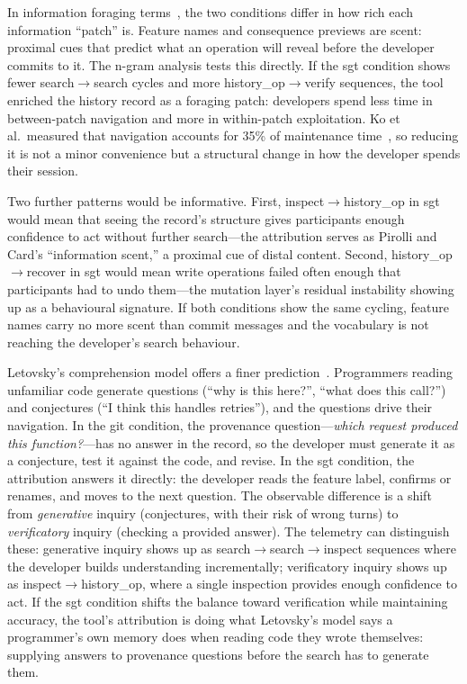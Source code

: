 In information foraging terms~\cite{pirolli1999}, the two conditions differ in
how rich each information ``patch'' is. Feature names and consequence previews
are scent: proximal cues that predict what an operation will reveal before the
developer commits to it. The n-gram analysis tests this directly. If the sgt
condition shows fewer search$\to$search cycles and more
history\_op$\to$verify sequences, the tool enriched the history record as a
foraging patch: developers spend less time in between-patch navigation and
more in within-patch exploitation. Ko et al.\ measured that navigation accounts
for 35\% of maintenance time~\cite{ko2006}, so reducing it is not a minor
convenience but a structural change in how the developer spends their session.

Two further patterns would be informative. First,
inspect$\to$history\_op in sgt would mean that seeing the record's structure
gives participants enough confidence to act without further search---the
attribution serves as Pirolli and Card's ``information scent,'' a proximal cue
of distal content. Second, history\_op$\to$recover in sgt would mean write
operations failed often enough that participants had to undo them---the mutation
layer's residual instability showing up as a behavioural signature. If both
conditions show the same cycling, feature names carry no more scent than commit
messages and the vocabulary is not reaching the developer's search behaviour.

Letovsky's comprehension model offers a finer prediction~\cite{letovsky1987}.
Programmers reading unfamiliar code generate questions (``why is this here?'',
``what does this call?'') and conjectures (``I think this handles retries''),
and the questions drive their navigation. In the git condition, the
provenance question---\emph{which request produced this function?}---has no
answer in the record, so the developer must generate it as a conjecture, test
it against the code, and revise. In the sgt condition, the attribution answers
it directly: the developer reads the feature label, confirms or renames, and
moves to the next question. The observable difference is a shift from \emph{generative} inquiry
(conjectures, with their risk of wrong turns) to \emph{verificatory} inquiry
(checking a provided answer). The telemetry can distinguish these: generative
inquiry shows up as search$\to$search$\to$inspect sequences where the
developer builds understanding incrementally; verificatory inquiry shows up as
inspect$\to$history\_op, where a single inspection provides enough confidence
to act. If the sgt condition shifts the balance toward verification while
maintaining accuracy, the tool's attribution is doing what Letovsky's model says
a programmer's own memory does when reading code they wrote themselves: supplying
answers to provenance questions before the search has to generate them.

